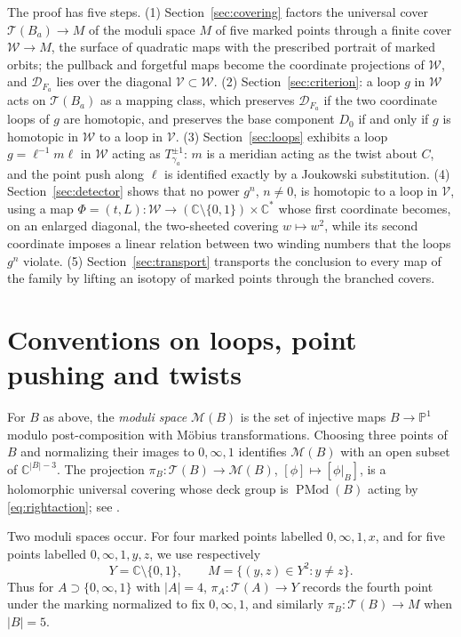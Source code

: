 \documentclass[11pt]{article}
\newcommand{\Pone}{\mathbb P^1}
\newcommand{\C}{\mathbb C}
\newcommand{\Teich}{\mathcal T}
\newcommand{\Mod}{\mathcal M}
\newcommand{\D}{\mathcal D}
\newcommand{\W}{\mathcal W}
\newcommand{\V}{\mathcal V}
\newcommand{\PMod}{\operatorname{PMod}}
\theoremstyle{remark}
\numberwithin{equation}{section}
\begin{document}
The proof has five steps. (1) Section~\ref{sec:covering} factors the
universal cover $\Teich(B_a)\to M$ of the moduli space $M$ of five marked
points through a finite cover $\W\to M$, the surface of quadratic maps with
the prescribed portrait of marked orbits; the pullback and forgetful maps
become the coordinate projections of $\W$, and $\D_{F_a}$ lies over the
diagonal $\V\subset\W$. (2) Section~\ref{sec:criterion}: a loop $g$ in
$\W$ acts on $\Teich(B_a)$ as a mapping class, which preserves $\D_{F_a}$
if the two coordinate loops of $g$ are homotopic, and preserves the base
component $D_0$ if and only if $g$ is homotopic in $\W$ to a loop in $\V$.
(3) Section~\ref{sec:loops} exhibits a loop $g=\ell^{-1}m\ell$ in $\W$
acting as $T_{\gamma_a}^{\pm1}$: $m$ is a meridian acting as the twist
about $C$, and the point push along $\ell$ is identified exactly by a
Joukowski substitution. (4) Section~\ref{sec:detector} shows that no power
$g^n$, $n\ne0$, is homotopic to a loop in $\V$, using a map
$\Phi=(t,L)\colon\W\to(\C\setminus\{0,1\})\times\C^*$ whose first
coordinate becomes, on an enlarged diagonal, the two-sheeted covering
$w\mapsto w^2$, while its second coordinate imposes a linear relation
between two winding numbers that the loops $g^n$ violate. (5)
Section~\ref{sec:transport} transports the conclusion to every map of the
family by lifting an isotopy of marked points through the branched covers.

\section{Conventions on loops, point pushing and twists}\label{sec:conventions}

For $B$ as above, the \emph{moduli space} $\Mod(B)$ is the set of injective
maps $B\to\Pone$ modulo post-composition with M\"obius transformations.
Choosing three points of $B$ and normalizing their images to $0,\infty,1$
identifies $\Mod(B)$ with an open subset of $\C^{|B|-3}$. The projection
$\pi_B\colon\Teich(B)\to\Mod(B)$, $[\phi]\mapsto[\phi|_B]$, is a holomorphic
universal covering whose deck group is $\PMod(B)$ acting by
\eqref{eq:rightaction}; see \cite[\S2.1]{KPS}.

Two moduli spaces occur. For four marked points labelled $0,\infty,1,x$,
and for five points labelled $0,\infty,1,y,z$, we use respectively
\begin{equation}\label{eq:YM}
 Y=\C\setminus\{0,1\},
 \qquad
 M=\{(y,z)\in Y^2:y\ne z\}.
\end{equation}
Thus for $A\supset\{0,\infty,1\}$ with $|A|=4$, $\pi_A\colon\Teich(A)\to Y$
records the fourth point under the marking normalized to fix $0,\infty,1$,
and similarly $\pi_B\colon\Teich(B)\to M$ when $|B|=5$.
\end{document}
